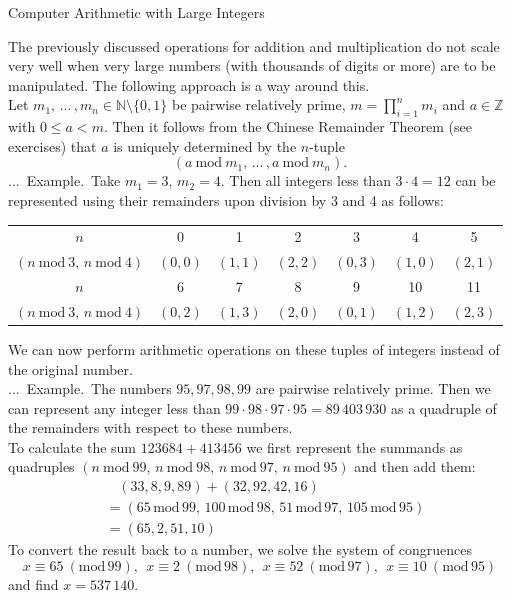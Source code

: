 \documentclass[smaller,hyperref={CJKbookmarks=true}]{beamer}
\newcommand{\N}{\mathbb{N}} \newcommand{\Z}{\mathbb{Z}} \newcommand{\Q}{\mathbb{Q}}
\newcounter{zhuo}[subsection]
\renewcommand{\thezhuo}{\thesection.\thesubsection.\arabic{zhuo}}
\newenvironment{EXAMPLE}{\stepcounter{zhuo}\alert{\!\thezhuo.~Example.\,}}{}
\begin{document}
\begin{frame}{Computer Arithmetic with Large Integers}
\begin{spacing}{1}
The previously discussed operations for addition and multiplication do not
scale very well when very large numbers (with thousands of digits or more)
are to be manipulated. The following approach is a way around this.\\[5pt]
Let $m_1,\,...\,,m_n\in\N\setminus\{0,1\}$ be pairwise relatively prime, $m=\prod_{i=1}^{n}m_i$ and $a\in\Z$ with $0\leq a<m$. Then it follows from the Chinese Remainder
Theorem (see exercises) that $a$ is uniquely determined by the $n$-tuple
\[(a~\text{mod}~m_1,\,...\,,a~\text{mod}~m_n).\]
\begin{EXAMPLE}
Take $m_1=3,\,m_2=4$. Then all integers less than $3\cdot4=12$ can be represented using their remainders upon division by 3
and 4 as follows:
\begin{center}
 \begin{tabular}{ccccccc}
   \toprule
   $n$ & 0 & 1 & 2 & 3 & 4 & 5 \\
   $(n~\text{mod}~3,\,n~\text{mod}~4)$ & $(0,0)$ & $(1,1)$ & $(2,2)$ & $(0,3)$ & $(1,0)$ & $(2,1)$ \\ \midrule
   $n$ & 6 & 7 & 8 & 9 & 10 & 11 \\
   $(n~\text{mod}~3,\,n~\text{mod}~4)$ & $(0,2)$ & $(1,3)$ & $(2,0)$ & $(0,1)$ & $(1,2)$ & $(2,3)$ \\
   \bottomrule
 \end{tabular}
\end{center}
\end{EXAMPLE}
\end{spacing}
\newpage
\begin{spacing}{0.9}
We can now perform arithmetic operations on these tuples of integers
instead of the original number.\\[5pt]
\begin{EXAMPLE}
The numbers $95,97,98,99$ are pairwise relatively prime. Then we can represent any integer less than $99\cdot98\cdot97\cdot95=89\,403\,930$ as a quadruple of the remainders with respect to these numbers.\\[5pt]
To calculate the sum $123684+413456$ we first represent the summands as quadruples $(n~\text{mod}~99,\,n~\text{mod}~98,\,n~\text{mod}~97,\,
n~\text{mod}~95)$ and then add them:
\begin{equation*}
  \begin{split}
       &~~~~(33,8,9,89)+(32,92,42,16) \\
       &=(65\,\text{mod}\,99,\,100\,\text{mod}\,98,\,
       51\,\text{mod}\,97,\,105\,\text{mod}\,95)  \\
       &=(65,2,51,10)
  \end{split}
\end{equation*}
To convert the result back to a number, we solve the system of congruences
\[x\equiv65\:(\text{mod}\,99),~~x\equiv2\:(\text{mod}\,98),~~
x\equiv52\:(\text{mod}\,97),~~x\equiv10\:(\text{mod}\,95)\]
and find $x=537\,140$.
\end{EXAMPLE}
\end{spacing}
\end{frame}
\end{document}
